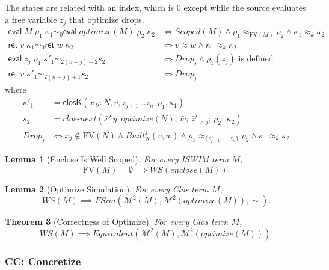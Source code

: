 \documentclass[10pt]{article}
\theoremstyle{acmplain}
\newtheorem{theorem}{Theorem}[section]
\newtheorem{lemma}[theorem]{Lemma}
\newcommand{\key}[1]{\mathsf{#1}}
\newcommand{\pass}[1]{\mathit{#1}}
\newcommand{\FV}{\mathrm{FV}}
\newcommand{\ev}[3]{\key{eval}\;#1\;#2\;#3}
\newcommand{\rt}[2]{\key{ret}\;#1\;#2}
\newcommand{\Mach}[1]{\mathcal{M}^{#1}}
\newcommand{\Equiv}{\mathit{Equivalent}}
\newcommand{\FSim}{\mathit{FSim}}
\newcommand{\Kf}[2]{\key{#1}(#2)}
\newcommand{\cnext}{\mathit{clos\text{-}next}}
\newcommand{\approxk}{\approx_k}
\begin{document}
The states are related with an index, which is $0$ except while the source
evaluates a free variable $z_j$ that optimize drops.
\begin{align*}
  \ev{M}{\rho_1}{\kappa_1} \sim_0 \ev{\pass{optimize}(M)}{\rho_2}{\kappa_2}
    &\iff \mathit{Scoped}(M) \land \rho_1 \approx_{\FV(M)} \rho_2 \land \kappa_1 \approxk \kappa_2 \\
  \rt{v}{\kappa_1} \sim_0 \rt{w}{\kappa_2} &\iff v \approx w \land \kappa_1 \approxk \kappa_2 \\
  \ev{z_j}{\rho_1}{\kappa'_1} \sim_{2(n-j)+2} s_2
    &\iff \mathit{Drop}_j \land \rho_1(z_j) \text{ is defined} \\
  \rt{v}{\kappa'_1} \sim_{2(n-j)+1} s_2 &\iff \mathit{Drop}_j
\end{align*}
where
\begin{align*}
  \kappa'_1 &= \Kf{closK}{\bar{x}\, y.\, N, \bar{v}, z_{j+1} \ldots z_n, \rho_1, \kappa_1} \\
  s_2 &= \cnext(\bar{x}'\, y.\, \pass{optimize}(N);\, \bar{w};\, \bar{z}'_{>j};\, \rho_2;\, \kappa_2) \\
  \mathit{Drop}_j &\iff x_j \notin \FV(N) \land \mathit{Built}^j_N(\bar{v}, \bar{w}) \land
      \rho_1 \approx_{\{z_{j+1}, \ldots, z_n\}} \rho_2 \land \kappa_1 \approxk \kappa_2
\end{align*}

\begin{lemma}[Enclose Is Well Scoped]\label{lem:enclose-ws}
For every ISWIM term $M$,
\[
  \FV(M) = \emptyset \implies \mathit{WS}(\pass{enclose}(M)) .
\]
\end{lemma}

\begin{lemma}[Optimize Simulation]\label{lem:optimize-fsim}
For every Clos term $M$,
\[
  \mathit{WS}(M) \implies \FSim(\Mach{2}(M), \Mach{2}(\pass{optimize}(M)), \sim) .
\]
\end{lemma}

\begin{theorem}[Correctness of Optimize]\label{thm:optimize-correct}
For every Clos term $M$,
\[
  \mathit{WS}(M) \implies \Equiv(\Mach{2}(M), \Mach{2}(\pass{optimize}(M))) .
\]
\end{theorem}

\subsubsection{CC: Concretize}\label{sec:sim-concretize}
\end{document}
